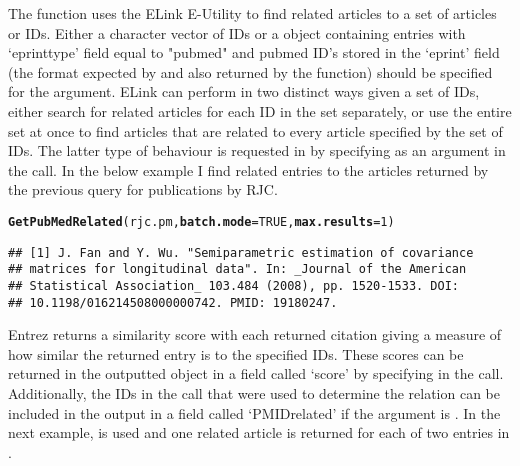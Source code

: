 \documentclass[article]{jss}\usepackage[]{graphicx}\usepackage[]{color}
\makeatletter
\newcommand{\hlnum}[1]{\textcolor[rgb]{0.125,0.125,1}{#1}}%
\newcommand{\hlstd}[1]{\textcolor[rgb]{0.251,0.251,0.282}{#1}}%
\newcommand{\hlkwc}[1]{\textcolor[rgb]{0.529,0,0.184}{\textbf{#1}}}%
\newcommand{\hlkwd}[1]{\textcolor[rgb]{0.251,0.251,0.282}{\textbf{#1}}}%
\newenvironment{kframe}{%
 \def\at@end@of@kframe{}%
 \ifinner\ifhmode%
  \def\at@end@of@kframe{\end{minipage}}%
  \begin{minipage}{\columnwidth}%
 \fi\fi%
 \def\FrameCommand##1{\hskip\@totalleftmargin \hskip-\fboxsep
 \colorbox{shadecolor}{##1}\hskip-\fboxsep
     \hskip-\linewidth \hskip-\@totalleftmargin \hskip\columnwidth}%
 \MakeFramed {\advance\hsize-\width
   \@totalleftmargin\z@ \linewidth\hsize
   \@setminipage}}%
 {\par\unskip\endMakeFramed%
 \at@end@of@kframe}
\newenvironment{knitrout}{}{} %
\makeatother
\begin{document}
The  function uses the ELink E-Utility to find related articles to a set of articles or IDs.  Either a character vector of IDs or a  object containing entries with `eprinttype' field equal to "pubmed" and pubmed ID's stored in the `eprint' field (the format expected by \Biblatex{} and also returned by the  function) should be specified for the  argument.  ELink can perform in two distinct ways given a set of IDs, either search for related articles for each ID in the set separately, or use the entire set at once to find articles that are related to every article specified by the set of IDs.  The latter type of behaviour is requested in  by specifying  as an argument in the call.  In the below example I find related entries to the articles returned by the previous query for publications by RJC.
\begin{knitrout}
\color{fgcolor}\begin{kframe}
\begin{alltt}
\hlkwd{GetPubMedRelated}\hlstd{(rjc.pm,} \hlkwc{batch.mode} \hlstd{=} \hlnum{TRUE}\hlstd{,} \hlkwc{max.results} \hlstd{=} \hlnum{1}\hlstd{)}
\end{alltt}
\begin{verbatim}
## [1] J. Fan and Y. Wu. "Semiparametric estimation of covariance
## matrices for longitudinal data". In: _Journal of the American
## Statistical Association_ 103.484 (2008), pp. 1520-1533. DOI:
## 10.1198/016214508000000742. PMID: 19180247.
\end{verbatim}
\end{kframe}
\end{knitrout}


Entrez returns a similarity score with each returned citation giving a measure of how similar the returned entry is to the specified IDs.  These scores can be returned in the outputted  object in a field called `score' by specifying  in the call.  Additionally, the IDs in the call that were used to determine the relation can be included in the output in a field called `PMIDrelated' if the argument  is .  In the next example,  is used and one related article is returned for each of two entries in .
\end{document}
